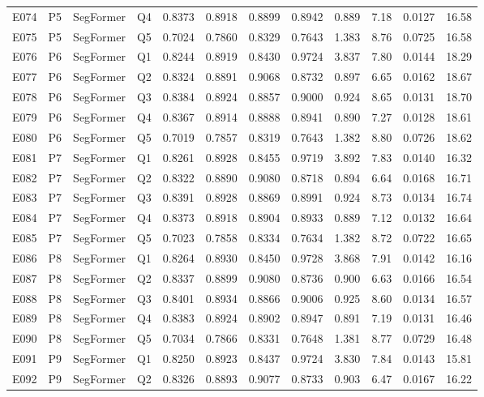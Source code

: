 \begin{longtable}{@{}lllllccccccc@{}}
E074 & P5 & SegFormer & Q4 & 0.8373 & 0.8918 & 0.8899 & 0.8942 & 0.889 & 7.18 & 0.0127 & 16.58 \\
E075 & P5 & SegFormer & Q5 & 0.7024 & 0.7860 & 0.8329 & 0.7643 & 1.383 & 8.76 & 0.0725 & 16.58 \\
E076 & P6 & SegFormer & Q1 & 0.8244 & 0.8919 & 0.8430 & 0.9724 & 3.837 & 7.80 & 0.0144 & 18.29 \\
E077 & P6 & SegFormer & Q2 & 0.8324 & 0.8891 & 0.9068 & 0.8732 & 0.897 & 6.65 & 0.0162 & 18.67 \\
E078 & P6 & SegFormer & Q3 & 0.8384 & 0.8924 & 0.8857 & 0.9000 & 0.924 & 8.65 & 0.0131 & 18.70 \\
E079 & P6 & SegFormer & Q4 & 0.8367 & 0.8914 & 0.8888 & 0.8941 & 0.890 & 7.27 & 0.0128 & 18.61 \\
E080 & P6 & SegFormer & Q5 & 0.7019 & 0.7857 & 0.8319 & 0.7643 & 1.382 & 8.80 & 0.0726 & 18.62 \\
E081 & P7 & SegFormer & Q1 & 0.8261 & 0.8928 & 0.8455 & 0.9719 & 3.892 & 7.83 & 0.0140 & 16.32 \\
E082 & P7 & SegFormer & Q2 & 0.8322 & 0.8890 & 0.9080 & 0.8718 & 0.894 & 6.64 & 0.0168 & 16.71 \\
E083 & P7 & SegFormer & Q3 & 0.8391 & 0.8928 & 0.8869 & 0.8991 & 0.924 & 8.73 & 0.0134 & 16.74 \\
E084 & P7 & SegFormer & Q4 & 0.8373 & 0.8918 & 0.8904 & 0.8933 & 0.889 & 7.12 & 0.0132 & 16.64 \\
E085 & P7 & SegFormer & Q5 & 0.7023 & 0.7858 & 0.8334 & 0.7634 & 1.382 & 8.72 & 0.0722 & 16.65 \\
E086 & P8 & SegFormer & Q1 & 0.8264 & 0.8930 & 0.8450 & 0.9728 & 3.868 & 7.91 & 0.0142 & 16.16 \\
E087 & P8 & SegFormer & Q2 & 0.8337 & 0.8899 & 0.9080 & 0.8736 & 0.900 & 6.63 & 0.0166 & 16.54 \\
E088 & P8 & SegFormer & Q3 & 0.8401 & 0.8934 & 0.8866 & 0.9006 & 0.925 & 8.60 & 0.0134 & 16.57 \\
E089 & P8 & SegFormer & Q4 & 0.8383 & 0.8924 & 0.8902 & 0.8947 & 0.891 & 7.19 & 0.0131 & 16.46 \\
E090 & P8 & SegFormer & Q5 & 0.7034 & 0.7866 & 0.8331 & 0.7648 & 1.381 & 8.77 & 0.0729 & 16.48 \\
E091 & P9 & SegFormer & Q1 & 0.8250 & 0.8923 & 0.8437 & 0.9724 & 3.830 & 7.84 & 0.0143 & 15.81 \\
E092 & P9 & SegFormer & Q2 & 0.8326 & 0.8893 & 0.9077 & 0.8733 & 0.903 & 6.47 & 0.0167 & 16.22 \\

\end{longtable}
